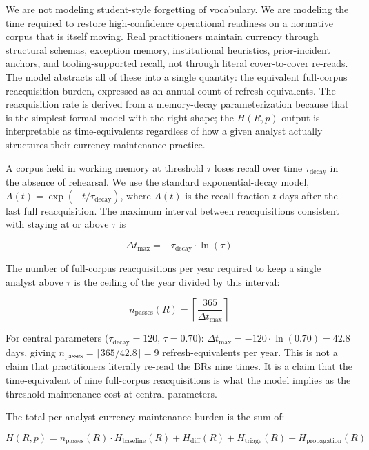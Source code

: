 \documentclass[11pt,letterpaper]{article}
\begin{document}
We are not modeling student-style forgetting of vocabulary. We are modeling the time required to restore high-confidence operational readiness on a normative corpus that is itself moving. Real practitioners maintain currency through structural schemas, exception memory, institutional heuristics, prior-incident anchors, and tooling-supported recall, not through literal cover-to-cover re-reads. The model abstracts all of these into a single quantity: the equivalent full-corpus reacquisition burden, expressed as an annual count of refresh-equivalents. The reacquisition rate is derived from a memory-decay parameterization because that is the simplest formal model with the right shape; the $H(R, p)$ output is interpretable as time-equivalents regardless of how a given analyst actually structures their currency-maintenance practice.

A corpus held in working memory at threshold $\tau$ loses recall over time $\tau_{\text{decay}}$ in the absence of rehearsal. We use the standard exponential-decay model, $A(t) = \exp(-t / \tau_{\text{decay}})$, where $A(t)$ is the recall fraction $t$ days after the last full reacquisition. The maximum interval between reacquisitions consistent with staying at or above $\tau$ is

\begin{equation}
\Delta t_{\max} = -\tau_{\text{decay}} \cdot \ln(\tau)
\end{equation}

The number of full-corpus reacquisitions per year required to keep a single analyst above $\tau$ is the ceiling of the year divided by this interval:

\begin{equation}
n_{\text{passes}}(R) = \left\lceil \frac{365}{\Delta t_{\max}} \right\rceil
\end{equation}

For central parameters ($\tau_{\text{decay}} = 120$, $\tau = 0.70$): $\Delta t_{\max} = -120 \cdot \ln(0.70) = 42.8$ days, giving $n_{\text{passes}} = \lceil 365 / 42.8 \rceil = 9$ refresh-equivalents per year. This is not a claim that practitioners literally re-read the BRs nine times. It is a claim that the time-equivalent of nine full-corpus reacquisitions is what the model implies as the threshold-maintenance cost at central parameters.

The total per-analyst currency-maintenance burden is the sum of:

\begin{equation}
H(R, p) = n_{\text{passes}}(R) \cdot H_{\text{baseline}}(R) + H_{\text{diff}}(R) + H_{\text{triage}}(R) + H_{\text{propagation}}(R)
\end{equation}
\end{document}

